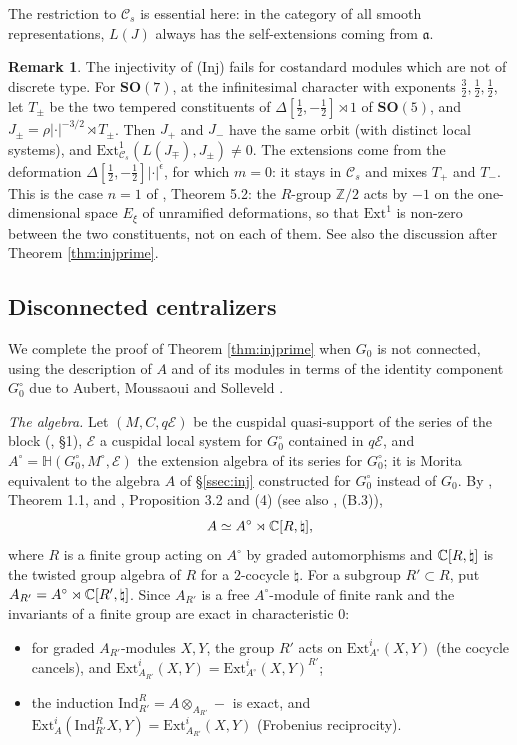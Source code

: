 \documentclass[a4paper,12pt,leqno]{amsart}
\theoremstyle{plain}
\theoremstyle{definition}
\newtheorem{rmk}[thm]{Remark}
\begin{document}
\noindent The restriction to $\mathcal{C}_s$ is essential here: in the category of all smooth
representations, $L(J)$ always has the self-extensions coming from $\mathfrak{a}$.

\begin{rmk}\label{rem:injcex} The injectivity of (Inj) fails for costandard modules which are not of discrete type. For
$\mathbf{SO}(7)$, at the infinitesimal character with exponents $\tfrac32,\tfrac12,\tfrac12$, let
$T_\pm$ be the two tempered constituents of $\Delta[\tfrac12,-\tfrac12]\rtimes1$ of $\mathbf{SO}(5)$,
and $J_\pm=\rho|\cdot|^{-3/2}\rtimes T_\pm$. Then $J_+$ and $J_-$ have the same orbit (with distinct
local systems), and $\mathrm{Ext}^1_{\mathcal{C}_s}(L(J_\mp),J_\pm)\neq0$. The extensions come from the
deformation $\Delta[\tfrac12,-\tfrac12]|\cdot|^{\epsilon}$, for which $m=0$: it stays in $\mathcal{C}_s$
and mixes $T_+$ and $T_-$. This is the case $n=1$ of \cite{OS13}, Theorem 5.2: the
$R$-group $\mathbb{Z}/2$ acts by $-1$ on the one-dimensional space $E_\xi$ of unramified deformations, so
that $\mathrm{Ext}^1$ is non-zero between the two constituents, not on each of them. See also the
discussion after Theorem \ref{thm:injprime}.
\end{rmk}

\subsection{Disconnected centralizers}\label{ssec:clifford}
We complete the proof of Theorem \ref{thm:injprime} when $G_0$ is not connected, using the description
of $A$ and of its modules in terms of the identity component $G_0^\circ$ due to Aubert, Moussaoui and
Solleveld \cite{AMS18}.

\emph{The algebra.} Let $(M,C,q\mathcal E)$ be the cuspidal quasi-support of the series of the block
(\cite{Sol25}, \S1), $\mathcal E$ a cuspidal local system for $G_0^\circ$ contained in $q\mathcal E$, and
$A^\circ=\mathbb H(G_0^\circ,M^\circ,\mathcal E)$ the extension algebra of its series for $G_0^\circ$; it
is Morita equivalent to the algebra $A$ of \S\ref{ssec:inj} constructed for $G_0^\circ$ instead of $G_0$. By
\cite{Sol25}, Theorem 1.1, and \cite{AMS18}, Proposition 3.2 and (4) (see also \cite{Sol25}, (B.3)),
\[A\simeq A^\circ\rtimes\mathbb{C}[R,\natural],\]
where $R$ is a finite group acting on $A^\circ$ by graded automorphisms and $\mathbb{C}[R,\natural]$ is the
twisted group algebra of $R$ for a $2$-cocycle $\natural$. For a subgroup $R'\subset R$, put
$A_{R'}=A^\circ\rtimes\mathbb{C}[R',\natural]$. Since $A_{R'}$ is a free $A^\circ$-module of finite rank and the
invariants of a finite group are exact in characteristic $0$:
\begin{itemize}
\item[(a)] for graded $A_{R'}$-modules $X,Y$, the group $R'$ acts on $\mathrm{Ext}^i_{A^\circ}(X,Y)$ (the
cocycle cancels), and $\mathrm{Ext}^i_{A_{R'}}(X,Y)=\mathrm{Ext}^i_{A^\circ}(X,Y)^{R'}$;
\item[(b)] the induction $\mathrm{Ind}_{R'}^R=A\otimes_{A_{R'}}-$ is exact, and
$\mathrm{Ext}^i_A(\mathrm{Ind}_{R'}^RX,Y)=\mathrm{Ext}^i_{A_{R'}}(X,Y)$ (Frobenius reciprocity).
\end{itemize}
\end{document}
